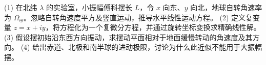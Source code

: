 (1) 在北纬 \(\lambda\) 的实验室，小振幅傅科摆长 \(L\)，令 \(x\) 向东、\(y\) 向北，地球自转角速率为 \(\Omega_\oplus\)。忽略自转角速度平方及竖直运动，推导水平线性运动方程。
(2) 定义复变量 \(z=x+iy\)，将方程化为一个复微分方程，并通过旋转坐标变换求精确线性解。
(3) 假设摆初始沿东西方向振动，求摆动平面相对于地面缓慢转动的角速度及其方向。
(4) 给出赤道、北极和南半球的进动极限，讨论为什么此近似不能用于大振幅摆。
